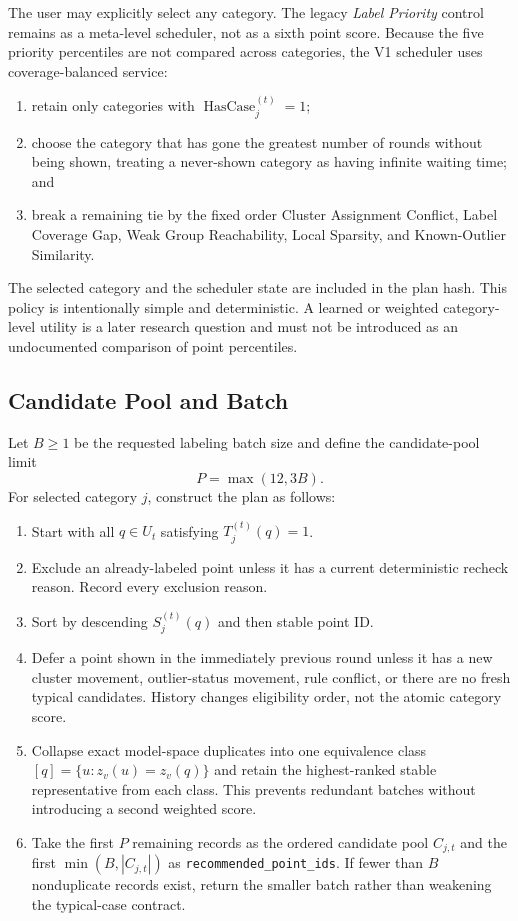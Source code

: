 \documentclass[11pt]{article}
\begin{document}
The user may explicitly select any category. The legacy \emph{Label Priority}
control remains as a meta-level scheduler, not as a sixth point score. Because
the five priority percentiles are not compared across categories, the V1
scheduler uses coverage-balanced service:
\begin{enumerate}[leftmargin=*]
    \item retain only categories with
    $\operatorname{HasCase}_j^{(t)}=1$;
    \item choose the category that has gone the greatest number of rounds
    without being shown, treating a never-shown category as having infinite
    waiting time; and
    \item break a remaining tie by the fixed order Cluster Assignment Conflict,
    Label Coverage Gap, Weak Group Reachability, Local Sparsity, and
    Known-Outlier Similarity.
\end{enumerate}
The selected category and the scheduler state are included in the plan hash.
This policy is intentionally simple and deterministic. A learned or weighted
category-level utility is a later research question and must not be introduced
as an undocumented comparison of point percentiles.

\subsection{Candidate Pool and Batch}

Let $B\geq1$ be the requested labeling batch size and define the candidate-pool
limit
\begin{equation}
    P=\max(12,3B).
\end{equation}
For selected category $j$, construct the plan as follows:
\begin{enumerate}[leftmargin=*]
    \item Start with all $q\in U_t$ satisfying $T_j^{(t)}(q)=1$.
    \item Exclude an already-labeled point unless it has a current deterministic
    recheck reason. Record every exclusion reason.
    \item Sort by descending $S_j^{(t)}(q)$ and then stable point ID.
    \item Defer a point shown in the immediately previous round unless it has a
    new cluster movement, outlier-status movement, rule conflict, or there are
    no fresh typical candidates. History changes eligibility order, not the
    atomic category score.
    \item Collapse exact model-space duplicates into one equivalence class
    $[q]=\{u:z_v(u)=z_v(q)\}$ and retain the highest-ranked stable representative
    from each class. This prevents redundant batches without introducing a
    second weighted score.
    \item Take the first $P$ remaining records as the ordered candidate pool
    $C_{j,t}$ and the first $\min(B,|C_{j,t}|)$ as
    \texttt{recommended\_point\_ids}. If fewer than $B$
    nonduplicate records exist, return the smaller batch rather than weakening
    the typical-case contract.
\end{enumerate}
\end{document}
